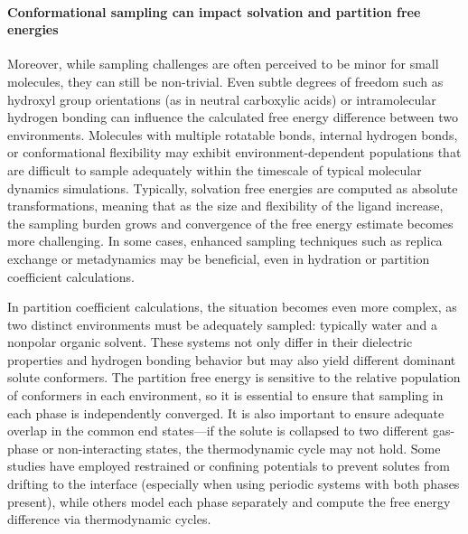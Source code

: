 \documentclass[9pt,bestpractices]{livecoms}
\begin{document}
\paragraph{Conformational sampling can impact solvation and partition free energies}
Moreover, while sampling challenges are often perceived to be minor for small molecules, they can still be non-trivial. Even subtle degrees of freedom such as hydroxyl group orientations (as in neutral carboxylic acids) or intramolecular hydrogen bonding can influence the calculated free energy difference between two environments\cite{klimovich2010predicting, lim2019assessing}. Molecules with multiple rotatable bonds, internal hydrogen bonds, or conformational flexibility may exhibit environment-dependent populations that are difficult to sample adequately within the timescale of typical molecular dynamics simulations. Typically, solvation free energies are computed as absolute transformations, meaning that as the size and flexibility of the ligand increase, the sampling burden grows and convergence of the free energy estimate becomes more challenging. In some cases, enhanced sampling techniques such as replica exchange\cite{rest2} or metadynamics\cite{hsu2023alchemical, khuttan2024make} may be beneficial, even in hydration or partition coefficient calculations.

In partition coefficient calculations, the situation becomes even more complex, as two distinct environments must be adequately sampled: typically water and a nonpolar organic solvent. These systems not only differ in their dielectric properties and hydrogen bonding behavior but may also yield different dominant solute conformers. The partition free energy is sensitive to the relative population of conformers in each environment, so it is essential to ensure that sampling in each phase is independently converged. It is also important to ensure adequate overlap in the common end states—if the solute is collapsed to two different gas-phase or non-interacting states, the thermodynamic cycle may not hold\cite{fan2021sampl7}. Some studies have employed restrained or confining potentials to prevent solutes from drifting to the interface (especially when using periodic systems with both phases present), while others model each phase separately and compute the free energy difference via thermodynamic cycles\cite{turchi2019,bannan2016,petris2021}.
\end{document}
